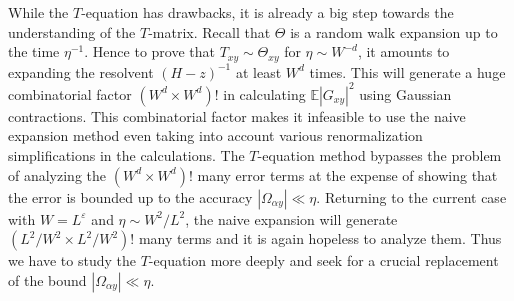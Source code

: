 \documentclass{article}
\newcommand{\1}{\mathds{1}}
\numberwithin{equation}{section}
\newcommand{\e}{{\varepsilon}}
\newcommand{\E}{\mathbb{E}}
\theoremstyle{plain} %
\theoremstyle{remark}
\begin{document}
While the $T$-equation has drawbacks, it is already a big step towards the understanding of the $T$-matrix. Recall that $\Theta$ is a random walk expansion up to the time $\eta^{-1}$. Hence to prove that $T_{xy}\sim \Theta_{xy}$ for $\eta \sim W^{-d}$, it amounts to expanding the resolvent $(H-z)^{-1}$ at least $W^{d}$ times. This will generate a huge combinatorial factor $(W^d \times W^d ) !$ in calculating $\E |G_{xy}|^2$ using Gaussian contractions. This combinatorial factor makes it infeasible to use the naive expansion method even taking into account various renormalization simplifications in the calculations. The $T$-equation method bypasses the problem of analyzing the $(W^d \times W^d)!$ many error terms at the expense of showing that the error is bounded up to the accuracy $|\Omega_{\alpha y}| \ll \eta$. Returning to the current case with $W = L^\e$ and $\eta \sim W^2/L^2$, the naive expansion will generate $(L^2/W^2\times L^2/W^2) !$ many terms and it is again hopeless to analyze them. Thus we have to study the $T$-equation more deeply and seek for a crucial replacement of the bound $|\Omega_{\alpha y}| \ll  \eta$. 



 
 
\end{document}
